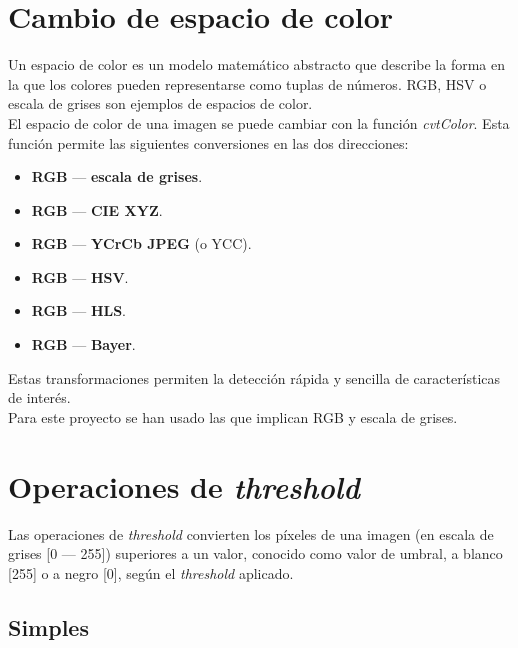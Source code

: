 \section{Cambio de espacio de color}
Un espacio de color es un modelo matemático abstracto que describe la
forma en la que los colores pueden representarse como tuplas de
números. RGB, HSV o escala de grises son ejemplos de espacios de color. \\
El espacio de color de una imagen se puede cambiar con la función
\emph{cvtColor}. Esta función permite las siguientes conversiones en
las dos direcciones:
\begin{itemize}
\item \textbf{RGB} --- \textbf{escala de grises}.
\item \textbf{RGB} --- \textbf{CIE XYZ}.
\item \textbf{RGB} --- \textbf{YCrCb JPEG} (o YCC).
\item \textbf{RGB} --- \textbf{HSV}.
\item \textbf{RGB} --- \textbf{HLS}.
\item \textbf{RGB} --- \textbf{Bayer}.
\end{itemize}
Estas transformaciones permiten la detección rápida y sencilla de
características
de interés. \\
Para este proyecto se han usado las que implican RGB y escala de
grises.

\section{Operaciones de \emph{threshold}}
Las operaciones de \emph{threshold} convierten los píxeles de una
imagen (en escala de grises [0 --- 255]) superiores a un valor,
conocido como valor de umbral, a blanco [255] o a negro [0], 
según el \emph{threshold} aplicado.
\subsection{Simples}

